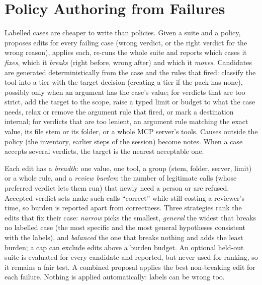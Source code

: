 \section{Policy Authoring from Failures}
\label{sec:authoring}

Labelled cases are cheaper to write than policies. Given a suite and a policy, \SystemName{} proposes edits for every failing case (wrong verdict, or the right verdict for the wrong reason), applies each, re-runs the whole suite and reports which cases it \emph{fixes}, which it \emph{breaks} (right before, wrong after) and which it \emph{moves}. Candidates are generated deterministically from the case and the rules that fired:
classify the tool into a tier with the target decision (creating a tier if the pack has none), possibly only when an argument has the case's value; for verdicts that are too strict, add the target to the scope, raise a typed limit or budget to what the case needs, relax or remove the argument rule that fired, or mark a destination internal; for verdicts that are too lenient, an argument rule matching the exact value, its file stem or its folder, or a whole MCP server's tools. Causes outside the policy (the inventory, earlier steps of the session) become notes. When a case accepts several verdicts, the target is the nearest acceptable one.

Each edit has a \emph{breadth}: one value, one tool, a group (stem, folder, server, limit) or a whole rule, and a \emph{review burden}: the number of legitimate calls (whose preferred verdict lets them run) that newly need a person or are refused. Accepted verdict sets make such calls ``correct'' while still costing a reviewer's time, so burden is reported apart from correctness. Three strategies rank the edits that fix their case: \emph{narrow} picks the smallest, \emph{general} the widest that breaks no labelled case (the most specific and the most general hypotheses consistent with the labels), and \emph{balanced} the one that breaks nothing and adds the least burden; a cap can exclude edits above a burden budget. An optional held-out suite is evaluated for every candidate and reported, but never used for ranking, so it remains a fair test. A combined proposal applies the best non-breaking edit for each failure. Nothing is applied automatically: labels can be wrong too.


